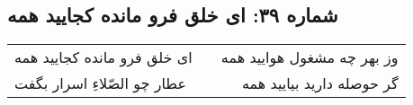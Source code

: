 \begin{center}
\section*{شماره ۳۹: ای خلق فرو مانده کجایید همه}
\label{sec:039}
\begin{longtable}{l p{0.5cm} r}
ای خلق فرو مانده کجایید همه
&&
وز بهر چه مشغول هوایید همه
\\
عطار چو الصّلاءِ اسرار بگفت
&&
گر حوصله دارید بیایید همه
\\
\end{longtable}
\end{center}
